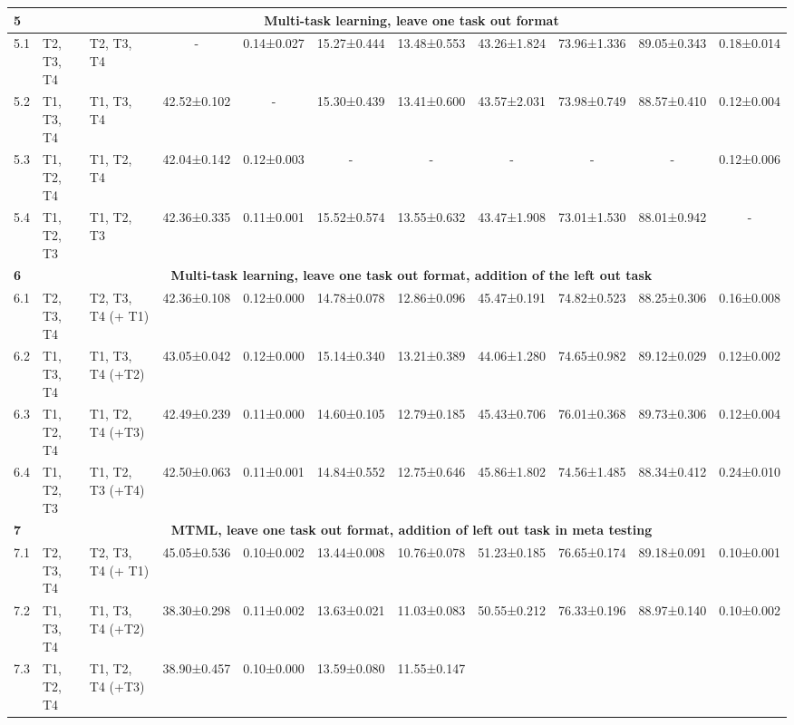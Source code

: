\documentclass[conference]{IEEEtran}
\begin{document}
\begin{table*}[t]
\begin{tiny}
{\begin{tabular}{lllcccccccc}
\textbf{5} &
  \multicolumn{10}{c}{\textbf{Multi-task learning, leave one task out format}} \\ \hline
5.1 &
  T2, T3, T4 &
  T2, T3, T4 &
  - & 
  0.14±0.027 &
  15.27±0.444 &
  13.48±0.553 &
  43.26±1.824 &
  73.96±1.336 &
  89.05±0.343 &
  0.18±0.014 \\
5.2 &
  T1, T3, T4 &
  T1, T3, T4 &
  42.52±0.102 &
  -  &
  15.30±0.439 &
  13.41±0.600 &
  43.57±2.031 &
  73.98±0.749 &
  88.57±0.410 &
  0.12±0.004 \\
5.3 &
  T1, T2, T4 &
  T1, T2, T4 &
  42.04±0.142 &
  0.12±0.003 &
  - &
  - &
  - &
  - &
  - &
  0.12±0.006 \\
5.4 &
  T1, T2, T3 &
  T1, T2, T3 &
  42.36±0.335 &
  0.11±0.001 &
  15.52±0.574 &
  13.55±0.632 &
  43.47±1.908 &
  73.01±1.530 &
  88.01±0.942 &
  - \\ \hline
\textbf{6} &
  \multicolumn{10}{c}{\textbf{Multi-task learning, leave one task out format, addition of the left out task}} \\ \hline
6.1 &
  T2, T3, T4 &
  T2, T3, T4 (+ T1) &
  42.36±0.108 &
  0.12±0.000 &
  14.78±0.078 &
  12.86±0.096 &
  45.47±0.191 &
  74.82±0.523 &
  88.25±0.306 &
  0.16±0.008 \\
6.2 &
  T1, T3, T4 &
  T1, T3, T4 (+T2) &
  43.05±0.042 &
  0.12±0.000 &
  15.14±0.340 &
  13.21±0.389 &
  44.06±1.280 &
  74.65±0.982 &
  89.12±0.029 &
  0.12±0.002 \\
6.3 &
  T1, T2, T4 &
  T1, T2, T4 (+T3) &
  42.49±0.239 &
  0.11±0.000 &
  14.60±0.105 &
  12.79±0.185 &
  45.43±0.706 &
  76.01±0.368 &
  89.73±0.306 &
  0.12±0.004 \\
6.4 &
  T1, T2, T3 &
  T1, T2, T3 (+T4) &
  42.50±0.063 &
  0.11±0.001 &
  14.84±0.552 &
  12.75±0.646 &
  45.86±1.802 &
  74.56±1.485 &
  88.34±0.412 &
  0.24±0.010 \\ \hline
\textbf{7} &
  \multicolumn{10}{c}{\textbf{\ac{MTML}, leave one task out format, addition of left out task in meta testing}} \\ \hline
7.1 &
  T2, T3, T4 &
  T2, T3, T4 (+ T1) &
  45.05±0.536 &
  0.10±0.002 &
  13.44±0.008 &
  10.76±0.078 &
  51.23±0.185 &
  76.65±0.174 &
  89.18±0.091 &
  0.10±0.001 \\
7.2 &
  T1, T3, T4 &
  T1, T3, T4 (+T2) &
  38.30±0.298 &
  0.11±0.002 &
  13.63±0.021 &
  11.03±0.083 &
  50.55±0.212 &
  76.33±0.196 &
  88.97±0.140 &
  0.10±0.002 \\
7.3 &
  T1, T2, T4 &
  T1, T2, T4 (+T3) &
  38.90±0.457 &
  0.10±0.000 &
  13.59±0.080 &
  11.55±0.147 &

\end{tabular}}
\end{tiny}
\end{table*}
\end{document}

